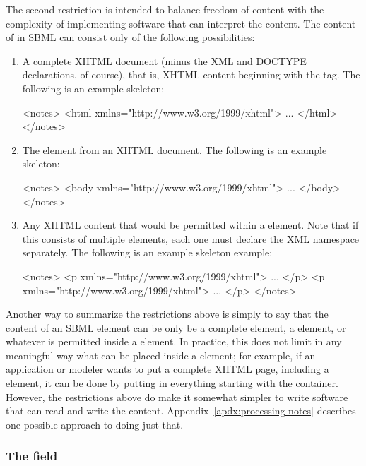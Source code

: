 The second restriction is intended to balance freedom of content
with the complexity of implementing software that can interpret
the content.  The content of  in SBML can consist
only of the following possibilities:
\begin{enumerate}
  
\item A complete XHTML document (minus the XML and DOCTYPE
  declarations, of course), that is, XHTML content beginning with
  the  tag.  The following is an example skeleton:
  \begin{example}
<notes>
    <html xmlns="http://www.w3.org/1999/xhtml">
    ...
    </html>
</notes>\end{example}

\item The  element from an XHTML document.  The
  following is an example skeleton:
  \begin{example}
<notes>
    <body xmlns="http://www.w3.org/1999/xhtml">
    ...
    </body>
</notes>\end{example}
  
\item Any XHTML content that would be permitted within a
   element.  Note that if this consists of multiple
  elements, each one must declare the XML namespace separately.
  The following is an example skeleton example:
  \begin{example}
<notes>
    <p xmlns="http://www.w3.org/1999/xhtml">
    ...
    </p>
    <p xmlns="http://www.w3.org/1999/xhtml">
    ...
    </p>
</notes>\end{example}

\end{enumerate}
Another way to summarize the restrictions above is simply to say
that the content of an SBML  element can be only be a
complete  element, a  element, or whatever
is permitted inside a  element.  In practice, this
does not limit in any meaningful way what can be placed inside a
 element; for example, if an application or modeler
wants to put a complete XHTML page, including a 
element, it can be done by putting in everything starting with the
 container.  However, the restrictions above do make
it somewhat simpler to write software that can read and write the
 content.  Appendix~\ref{apdx:processing-notes}
describes one possible approach to doing just that.


\subsubsection{The  field}
\label{sec:annotation-use}

